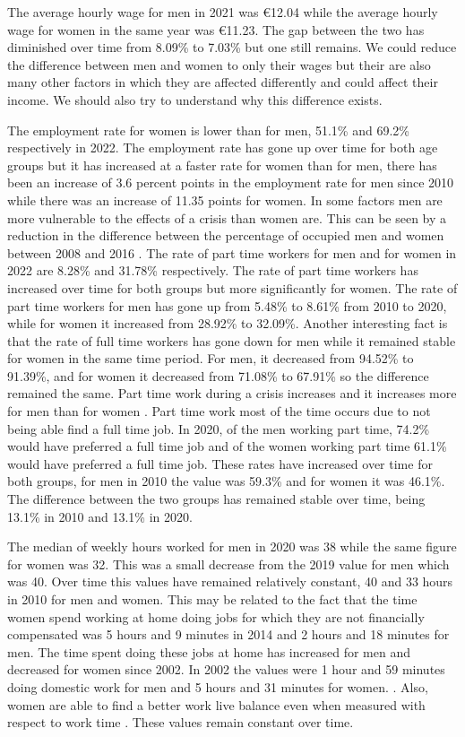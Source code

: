 \documentclass[12pt]{article}
\begin{document}
\begin{spacing}{1.5}

The average hourly wage for men in 2021 was €12.04 while the average hourly wage for women in the same year was €11.23. The gap between the two has diminished over time from 8.09\% to 7.03\% but one still remains. We could reduce the difference between men and women to only their wages but their are also many other factors in which they are affected differently and could affect their income. We should also try to understand why this difference exists.

The employment rate for women is lower than for men, 51.1\% and 69.2\% respectively in 2022. The employment rate has gone up over time for both age groups but it has increased at a faster rate for women than for men, there has been an increase of 3.6 percent points in the employment rate for men since 2010 while there was an increase of 11.35 points for women. In some factors men are more vulnerable to the effects of a crisis than women are. This can be seen by a reduction in the difference between the percentage of occupied men and women between 2008 and 2016 \cite{canal2018punto}. The rate of part time workers for men and for women in 2022 are 8.28\% and 31.78\% respectively. The rate of part time workers has increased over time for both groups but more significantly for women. The rate of part time workers for men has gone up from 5.48\% to 8.61\% from 2010 to 2020, while for women it increased from 28.92\% to 32.09\%. Another interesting fact is that the rate of full time workers has gone down for men while it remained stable for women in the same time period. For men, it decreased from 94.52\% to 91.39\%, and for women it decreased from 71.08\% to 67.91\% so the difference remained the same. Part time work during a crisis increases and it increases more for men than for women \cite{canal2018punto}. Part time work most of the time occurs due to not being able find a full time job. In 2020, of the men working part time, 74.2\% would have preferred a full time job and of the women working part time 61.1\% would have preferred a full time job. These rates have increased over time for both groups, for men in 2010 the value was 59.3\% and for women it was 46.1\%. The difference between the two groups has remained stable over time, being 13.1\% in 2010 and 13.1\% in 2020.

The median of weekly hours worked for men in 2020 was 38 while the same figure for women was 32. This was a small decrease from the 2019 value for men which was 40. Over time this values have remained relatively constant, 40 and 33 hours in 2010 for men and women. This may be related to the fact that the time women spend working at home doing jobs for which they are not financially compensated was 5 hours and 9 minutes in 2014 and 2 hours and 18 minutes for men. The time spent doing these jobs at home has increased for men and decreased for women since 2002. In 2002 the values were 1 hour and 59 minutes doing domestic work for men and 5 hours and 31 minutes for women. \cite{cappadozzi2019tempi}. Also, women are able to find a better work live balance even when measured with respect to work time \cite{canal2018punto}. These values remain constant over time.


\end{spacing}
\end{document}

